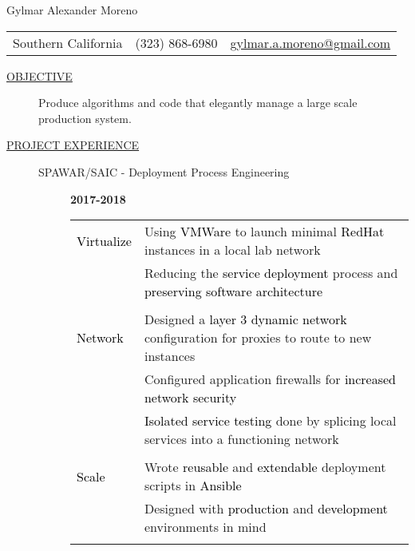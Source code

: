 \documentclass[12pt]{article}
\begin{document}
    \begin{center}
        {\LARGE Gylmar Alexander Moreno}
	\\
        \begin{tabular}{l|l|l}
            Southern California & (323) 868-6980 &
            \href{mailto:gylmar.a.moreno@gmail.com}{gylmar.a.moreno@gmail.com}
        \end{tabular}
    \end{center}

    \begin{description}
        \item[\underline{OBJECTIVE}] Produce algorithms and code that elegantly manage a large scale production system.
            \iffalse Produce algorithms and code that elegantly manage a large scale production system that\fi
        \item[\underline{PROJECT EXPERIENCE}] \hfill
            \begin{description}
                \item[SPAWAR/SAIC - Deployment Process Engineering] \hfill \textbf{2017-2018}\\
		\textcolor{gray}{
			\begin{tabular}{l|l}
					    \\[-1.0mm]
				\textcolor{black}{Virtualize} & Using \textcolor{black}{VMWare} to launch minimal \textcolor{black}{RedHat} instances in a local lab network\\
					   & Reducing the \textcolor{black}{service deployment} process and \textcolor{black}{preserving software architecture}\\
					    \\[-1.7mm]
				\textcolor{black}{Network}   & Designed a \textcolor{black}{layer 3 dynamic network} configuration for proxies to route to new instances\\
					   & Configured application firewalls for \textcolor{black}{increased network security}\\
					   & \textcolor{black}{Isolated service testing} done by splicing local services into a functioning network\\
					    \\[-1.7mm]
				\textcolor{black}{Scale}   & Wrote \textcolor{black}{reusable} and \textcolor{black}{extendable} deployment scripts in \textcolor{black}{Ansible}\\
					   & Designed with \textcolor{black}{production} and \textcolor{black}{development} environments in mind\\
					    \\[-1.0mm]
		    	\end{tabular}
	    	}


\end{description}
\end{description}
\end{document}
